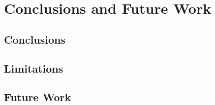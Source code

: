 \chapter{Conclusions and Future Work}

\section{Conclusions}
\section{Limitations}
\section{Future Work}
